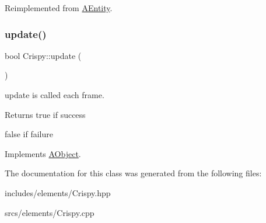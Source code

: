 Reimplemented from \hyperlink{class_a_entity_ae2faa1d11e21033a223fef2bc03b9338}{A\+Entity}.

\mbox{\label{class_crispy_ab33c8c68fa636df5721581e8f68ceae3}} 
\subsubsection{\texorpdfstring{update()}{update()}}
{\footnotesize\ttfamily bool Crispy\+::update (\begin{DoxyParamCaption}{ }\end{DoxyParamCaption})\hspace{0.3cm}{\ttfamily [virtual]}}



update is called each frame. 

\begin{DoxyReturn}{Returns}
true if success 

false if failure 
\end{DoxyReturn}


Implements \hyperlink{class_a_object_af35bb4b68af0a11bb1fcf617bde41ecd}{A\+Object}.



The documentation for this class was generated from the following files\+:\begin{DoxyCompactItemize}
\item 
includes/elements/Crispy.\+hpp\item 
srcs/elements/Crispy.\+cpp\end{DoxyCompactItemize}
